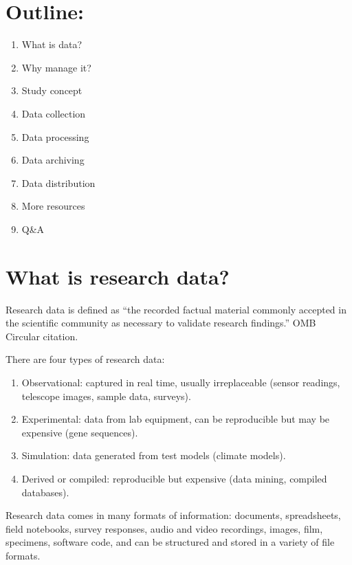 \documentclass{tufte-handout}
\begin{document}
\section{Outline:}\label{outline}

\begin{enumerate}
\def\labelenumi{\arabic{enumi}.}
\itemsep1pt\parskip0pt
\item
  What is data?
\item
  Why manage it?
\item
  Study concept
\item
  Data collection
\item
  Data processing
\item
  Data archiving
\item
  Data distribution
\item
  More resources
\item
  Q\&A
\end{enumerate}

\section{What is research data?}\label{what-is-research-data}

Research data is defined as ``the recorded factual material commonly
accepted in the scientific community as necessary to validate research
findings.'' OMB Circular citation.

There are four types of research data:

\begin{enumerate}
\def\labelenumi{\arabic{enumi}.}
\itemsep1pt\parskip0pt
\item
  Observational: captured in real time, usually irreplaceable (sensor
  readings, telescope images, sample data, surveys).
\item
  Experimental: data from lab equipment, can be reproducible but may be
  expensive (gene sequences).
\item
  Simulation: data generated from test models (climate models).
\item
  Derived or compiled: reproducible but expensive (data mining, compiled
  databases).
\end{enumerate}

Research data comes in many formats of information: documents,
spreadsheets, field notebooks, survey responses, audio and video
recordings, images, film, specimens, software code, and can be
structured and stored in a variety of file formats.
\end{document}
